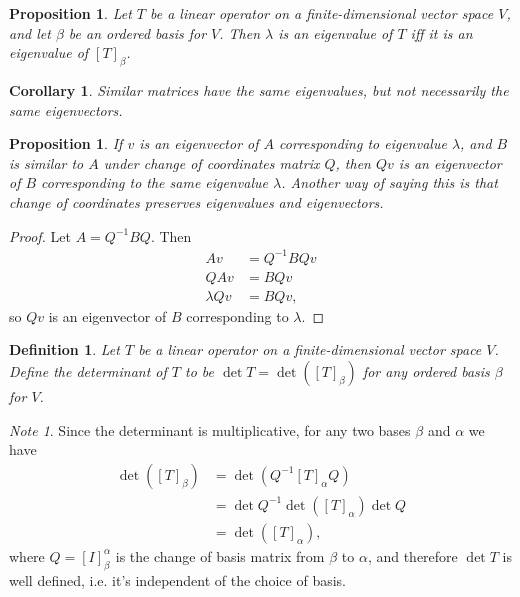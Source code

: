 \documentclass[12pt]{article}
\theoremstyle{plain}
\newtheorem{corollary}[theorem]{Corollary}
\newtheorem{proposition}[theorem]{Proposition}
\newtheorem{definition}[theorem]{Definition}
\theoremstyle{definition}
\theoremstyle{remark}
\newtheorem{note}[theorem]{Note}
\begin{document}
\begin{proposition}
Let $T$ be a linear operator on a finite-dimensional vector space $V$, and let $\beta$ be an ordered basis for $V$. Then $\lambda$ is an eigenvalue of $T$ iff it is an eigenvalue of $[T]_\beta$.
\end{proposition}

\begin{corollary}
Similar matrices have the same eigenvalues, but not necessarily the same eigenvectors.
\end{corollary}

\begin{proposition}
If $v$ is an eigenvector of $A$ corresponding to eigenvalue $\lambda$, and $B$ is similar to $A$ under change of coordinates matrix $Q$, then $Qv$ is an eigenvector of $B$ corresponding to the same eigenvalue $\lambda$.  Another way of saying this is that change of coordinates preserves eigenvalues and eigenvectors.
\end{proposition}

\begin{proof}
Let $A = Q^{-1}BQ$. Then
\begin{align*}
Av &= Q^{-1}BQv \\
QAv &= BQv \\
\lambda Qv &= BQv,
\end{align*}
so $Qv$ is an eigenvector of $B$ corresponding to $\lambda$.
\end{proof}

\begin{definition}\label{determinantofoperator}
Let $T$ be a linear operator on a finite-dimensional vector space $V$. Define the determinant of $T$ to be $\det T = \det([T]_\beta)$ for any ordered basis $\beta$ for $V$.
\end{definition}

\begin{note}
Since the determinant is multiplicative, for any two bases $\beta$ and $\alpha$ we have
\begin{align*}
\det([T]_\beta) &= \det(Q^{-1} [T]_\alpha Q) \\
&= \det Q^{-1} \det([T]_\alpha) \det Q \\
&= \det([T]_\alpha),
\end{align*}
where $Q = [I]^\alpha_\beta$ is the change of basis matrix from $\beta$ to $\alpha$, and therefore $\det T$ is well defined, i.e. it's independent of the choice of basis.
\end{note}
\end{document}
